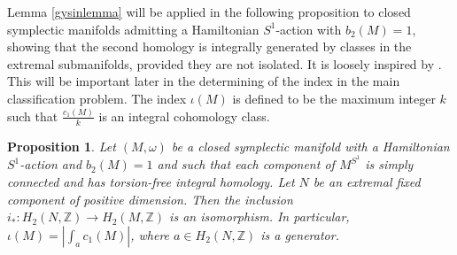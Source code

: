\documentclass[12pt]{article}
\newtheorem{proposition}[theorem]{Proposition}
\begin{document}
Lemma \ref{gysinlemma} will be applied in the following proposition to closed symplectic manifolds admitting a Hamiltonian  $S^1$-action with $b_{2}(M)=1$, showing that the second homology is integrally generated by classes in the extremal submanifolds, provided they are not isolated. It is loosely inspired by \cite[Proposition 0.2]{PeSc}. This will be important later in the determining of the index in the main classification problem. The index $\iota(M)$ is defined to be the maximum integer $k$ such that $\frac{c_1(M)}{k}$ is an integral cohomology class.
\begin{proposition} \label{indexprop} Let $(M,\omega)$ be a closed symplectic manifold with a Hamiltonian $S^1$-action and $b_{2}(M)=1$ and such that each component of $M^{S^1}$ is simply connected and has torsion-free integral homology. Let $N$ be an extremal fixed component of positive dimension. Then the inclusion $i_{*}: H_{2}(N,\mathbb{Z}) \rightarrow H_{2}(M,\mathbb{Z})$ is an isomorphism. In particular, $\iota(M) = |\int_{a} c_{1}(M)|$, where $a \in H_{2}(N,\mathbb{Z})$ is a generator.
\end{proposition}
\end{document}
